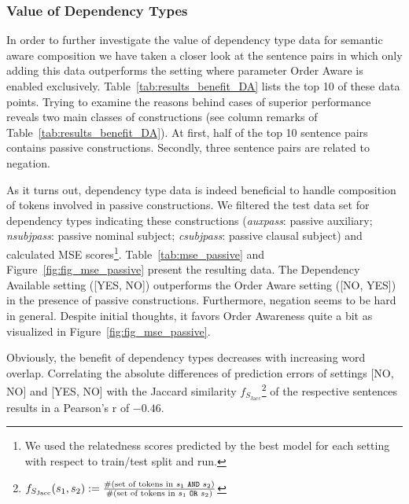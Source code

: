 
\subsubsection{Value of Dependency Types}
In order to further investigate the value of dependency type data for semantic aware composition we have taken a closer look at the sentence pairs in which only adding this data outperforms the setting where parameter Order Aware is enabled exclusively. Table~\ref{tab:results_benefit_DA} lists the top 10 of these data points. Trying to examine the reasons behind cases of superior performance reveals two main classes of constructions (see column remarks of Table~\ref{tab:results_benefit_DA}). At first, half of the top 10 sentence pairs contains passive constructions. Secondly, three sentence pairs are related to negation. 

As it turns out, dependency type data is indeed beneficial to handle composition of tokens involved in passive constructions. We filtered the test data set for dependency types indicating these constructions (\textit{auxpass}: passive auxiliary; \textit{nsubjpass}: passive nominal subject; \textit{csubjpass}: passive clausal subject) and calculated \ac{MSE} scores\footnote{We used the relatedness scores predicted by the best model for each setting with respect to train/test split and run.}. Table~\ref{tab:mse_passive} and Figure~\ref{fig:fig_mse_passive} present the resulting data. The Dependency Available setting ([YES, NO]) outperforms the Order Aware setting ([NO, YES]) in the presence of passive constructions. Furthermore, negation seems to be hard in general. Despite initial thoughts, it favors Order Awareness quite a bit as visualized in Figure~\ref{fig:fig_mse_passive}.

Obviously, the benefit of dependency types decreases with increasing word overlap. Correlating the absolute differences of prediction errors of settings [NO, NO] and [YES, NO] with the Jaccard similarity $f_{S_\text{Jacc}}$\footnote{$f_{S_\text{Jacc}}(s_1, s_2) := \frac{\text{\#(set of tokens in $s_1$ \texttt{AND} $s_2$)}}{\text{\#(set of tokens in $s_1$ \texttt{OR} $s_2$)}}$} of the respective sentences results in a Pearson's r of $-0.46$.

